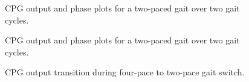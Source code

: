 				\begin{figure}[!h]
					\centering
					\caption{CPG output and phase plots for a two-paced gait over two gait cycles.}
					\label{fig::cpg_phase2_45}
				\end{figure}
				\begin{figure}[!h]
					\centering
					\caption{CPG output and phase plots for a two-paced gait over two gait cycles.}
					\label{fig::cpg_phase4_45}
				\end{figure}
				\begin{figure}[!h]
					\centering
					\caption{CPG output transition during four-pace to two-pace gait switch.}
					\label{fig::cpg_transition}
				\end{figure}	

